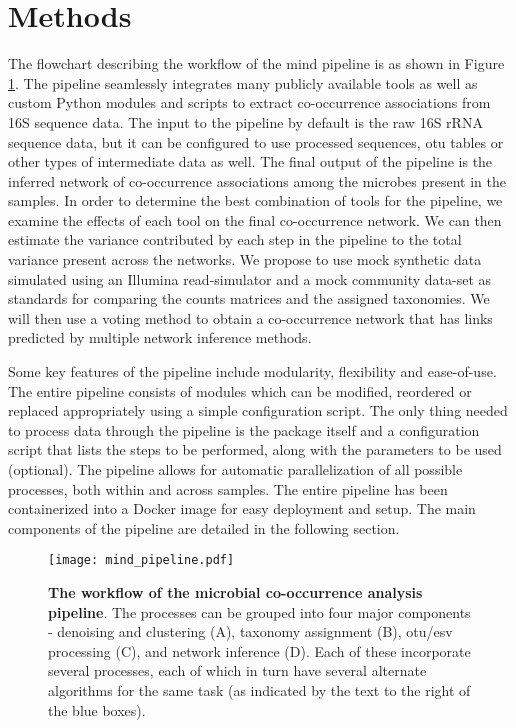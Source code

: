 
\section*{Methods}

  The flowchart describing the workflow of the \ac{mind} pipeline is as shown in Figure \ref{fig:mind_pipeline}.
  The pipeline seamlessly integrates many publicly available tools as well as custom Python modules and scripts to extract co-occurrence associations from 16S sequence data.
  The input to the pipeline by default is the raw 16S rRNA sequence data, but it can be configured to use processed sequences, \ac{otu} tables or other types of intermediate data as well.
  The final output of the pipeline is the inferred network of co-occurrence associations among the microbes present in the samples.
  In order to determine the best combination of tools for the pipeline, we examine the effects of each tool on the final co-occurrence network.
  We can then estimate the variance contributed by each step in the pipeline to the total variance present across the networks.
  We propose to use mock synthetic data simulated using an Illumina read-simulator \cite{Escalona2016} and a mock community data-set \cite{Bokulich2016} as standards for comparing the counts matrices and the assigned taxonomies.
  We will then use a voting method to obtain a co-occurrence network that has links predicted by multiple network inference methods.

  Some key features of the pipeline include modularity, flexibility and ease-of-use.
  The entire pipeline consists of modules which can be modified, reordered or replaced appropriately using a simple configuration script.
  The only thing needed to process data through the pipeline is the package itself and a configuration script that lists the steps to be performed, along with the parameters to be used (optional).
  The pipeline allows for automatic parallelization of all possible processes, both within and across samples.
  The entire pipeline has been containerized into a Docker \cite{Merkel1994} image for easy deployment and setup.
  The main components of the pipeline are detailed in the following section.

  \begin{figure}[h]
    \centering
    \texttt{[image: mind\_pipeline.pdf]}
    \caption{
      \textbf{The workflow of the microbial co-occurrence analysis pipeline}.
        The processes can be grouped into four major components - denoising and clustering (A), taxonomy assignment (B), \ac{otu}/\ac{esv} processing (C), and network inference (D).
        Each of these incorporate several processes, each of which in turn have several alternate algorithms for the same task (as indicated by the text to the right of the blue boxes).
    }
    \label{fig:mind_pipeline}
  \end{figure}

